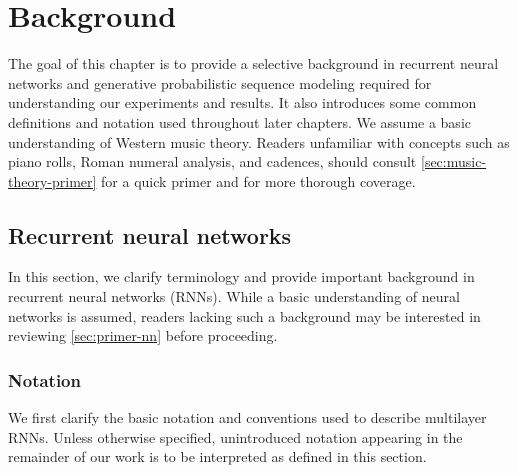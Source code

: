 \chapter{Background}

\ifpdf
    \graphicspath{{Chapter2/Figs/Raster/}{Chapter2/Figs/PDF/}{Chapter2/Figs/}}
\else
    \graphicspath{{Chapter2/Figs/Vector/}{Chapter2/Figs/}}
\fi


The goal of this chapter is to provide a selective background in recurrent neural
networks and generative probabilistic sequence modeling required for understanding
our experiments and results. It also introduces some common definitions and
notation used throughout later chapters. We assume a basic understanding of
Western music theory. Readers unfamiliar with concepts such as piano rolls,
Roman numeral analysis, and cadences, should consult
\vref{sec:music-theory-primer} for a quick primer and
\citet{piston1978harmony,denny1960oxford} for more thorough coverage.

\section{Recurrent neural networks}


In this section, we clarify terminology and provide important background in
recurrent neural networks (RNNs). While a basic understanding of neural
networks is assumed, readers lacking such a background may be interested in
reviewing \vref{sec:primer-nn} before proceeding.

\subsection{Notation}


We first clarify the basic notation and conventions used to describe multilayer
RNNs. Unless otherwise specified, unintroduced notation appearing in the
remainder of our work is to be interpreted as defined in this section.

